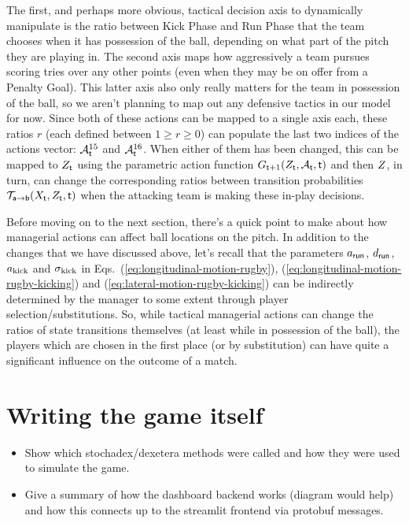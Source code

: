 The first, and perhaps more obvious, tactical decision axis to dynamically manipulate is the ratio between {\sf Kick Phase} and {\sf Run Phase} that the team chooses when it has possession of the ball, depending on what part of the pitch they are playing in. The second axis maps how aggressively a team pursues scoring tries over any other points (even when they may be on offer from a {\sf Penalty Goal}). This latter axis also only really matters for the team in possession of the ball, so we aren't planning to map out any defensive tactics in our model for now. Since both of these actions can be mapped to a single axis each, these ratios $r$ (each defined between $1\geq r \geq 0$) can populate the last two indices of the actions vector: ${\cal A}^{15}_{\sf t}$ and ${\cal A}^{16}_{\sf t}$. When either of them has been changed, this can be mapped to $Z_{\sf t}$ using the parametric action function $G_{{\sf t}+1}(Z_{\sf t},{\cal A}_{\sf t},{\sf t})$ and then $Z_{\sf}$, in turn, can change the corresponding ratios between transition probabilities ${\cal T}_{{\sf a}\rightarrow {\sf b}}(X_{\sf t},Z_{\sf t},{\sf t})$ when the attacking team is making these in-play decisions.

Before moving on to the next section, there's a quick point to make about how managerial actions can affect ball locations on the pitch. In addition to the changes that we have discussed above, let's recall that the parameters $a_{\sf run}$, $d_{\sf run}$, $a_{\rm kick}$ and $\sigma_{\rm kick}$ in Eqs.~(\ref{eq:longitudinal-motion-rugby}), (\ref{eq:longitudinal-motion-rugby-kicking}) and (\ref{eq:lateral-motion-rugby-kicking}) can be indirectly determined by the manager to some extent through player selection/substitutions. So, while tactical managerial actions can change the ratios of state transitions themselves (at least while in possession of the ball), the players which are chosen in the first place (or by substitution) can have quite a significant influence on the outcome of a match.

\section{\sffamily Writing the game itself}

\begin{itemize}
\item{Show which stochadex/dexetera methods were called and how they were used to simulate the game.}
\item{Give a summary of how the dashboard backend works (diagram would help) and how this connects up to the streamlit frontend via protobuf messages.}
\end{itemize}